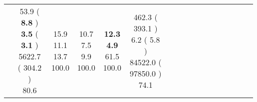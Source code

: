 \documentclass[9pt]{article}
\begin{document}
\begin{landscape}
\begin{longtable}{ l | c c c c | c c c c | c c c c | c c c c |}
 &
                    
                            \makecell{              53.9
     (             \textbf{ 8.8 }
    ) \\
            {\footnotesize             \textbf{ 3.5 }
     (              \textbf{ 3.1 }
     )} \\
            {\footnotesize             5622.7
     (            304.2
    ) } \\
            {\small  \textcolor[rgb]{ 0.588 , 0.312 , 0.1} {80.6  }
} }


             &
                            \makecell{              15.9
     \\
            {\footnotesize             11.1
    } \\  {\footnotesize             13.7
     } \\
            {\small \textcolor[rgb]{ 0.2 , 0.7 , 0.1} {100.0  }
} }
             &                         \makecell{              10.7
     \\
            {\footnotesize             7.5
    } \\  {\footnotesize             9.9
     } \\
            {\small \textcolor[rgb]{ 0.2 , 0.7 , 0.1} {100.0  }
} }
             &
                            \makecell{              \textbf{ 12.3 }
     \\
            {\footnotesize             \textbf{ 4.9 }
    } \\  {\footnotesize             61.5
     } \\
            {\small \textcolor[rgb]{ 0.2 , 0.7 , 0.1} {100.0  }
} }
            

 & 
                            \makecell{              462.3
     (             393.1
    ) \\
            {\footnotesize             6.2
     (              5.8
     )} \\
            {\footnotesize             84522.0
     (            97850.0
    ) } \\
            {\small  \textcolor[rgb]{ 0.718 , 0.183 , 0.1} {74.1  }
} }



\end{longtable}
\end{landscape}
\end{document}
